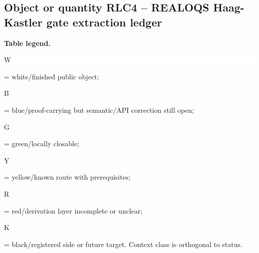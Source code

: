 \subsection*{Object or quantity RLC4 -- REALOQS Haag-Kastler gate extraction ledger}
\hypertarget{objproof:RLC4}{}
\par\smallskip\noindent\begin{minipage}{0.99\linewidth}\footnotesize\raggedright\textbf{Table legend.} \colorbox{white}{\strut W} = white/finished public object; \colorbox{cyan!20}{\strut B} = blue/proof-carrying but semantic/API correction still open; \colorbox{green!18}{\strut G} = green/locally closable; \colorbox{yellow!25}{\strut Y} = yellow/known route with prerequisites; \colorbox{red!20}{\strut R} = red/derivation layer incomplete or unclear; \colorbox{black!18}{\strut K} = black/registered side or future target. Context class is orthogonal to status.\end{minipage}\par\vspace{0.25em}
